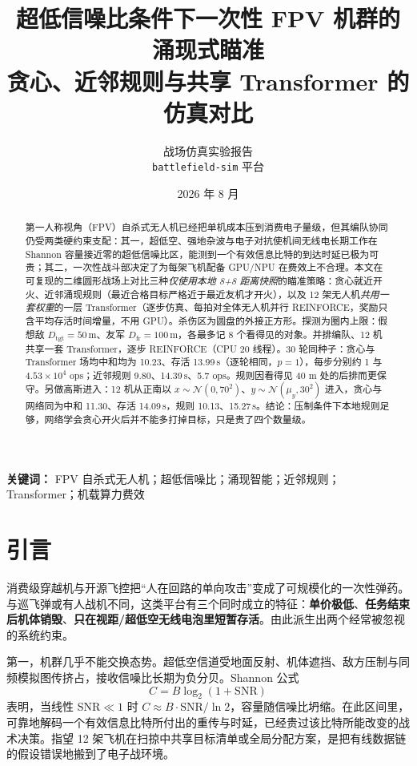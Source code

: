 \documentclass[12pt,a4paper]{article}
\title{\textbf{超低信噪比条件下一次性 FPV 机群的涌现式瞄准}\\[0.35em]
\large 贪心、近邻规则与共享 Transformer 的仿真对比}
\author{战场仿真实验报告\\
\texttt{battlefield-sim} 平台}
\date{2026 年 8 月}
\begin{document}
\maketitle

\begin{abstract}
第一人称视角（FPV）自杀式无人机已经把单机成本压到消费电子量级，但其编队协同仍受两类硬约束支配：其一，超低空、强地杂波与电子对抗使机间无线电长期工作在 Shannon 容量接近零的超低信噪比区，能测到一个有效信息比特的到达时延已极为可贵；其二，一次性战斗部决定了为每架飞机配备 GPU/NPU 在费效上不合理。本文在可复现的二维圆形战场上对比三种\emph{仅使用本地 8+8 距离快照}的瞄准策略：贪心就近开火、近邻涌现规则（最近合格目标严格近于最近友机才开火），以及 12 架无人机\emph{共用一套权重}的一层 Transformer（逐步仿真、每拍对全体无人机并行 REINFORCE，奖励只含平均存活时间增量，不用 GPU）。杀伤区为圆盘的外接正方形。探测为圈内上限：假想敌 $D_{\mathrm{tgt}}=50\,\mathrm{m}$、友军 $D_{\mathrm{fr}}=100\,\mathrm{m}$，各最多记 8 个看得见的对象。并排编队、12 机共享一套 Transformer，逐步 REINFORCE（CPU 20 线程）。30 轮同种子：贪心与 Transformer 场均中和均为 10.23、存活 13.99\,s（逐轮相同，$p=1$），每步分别约 1 与 $4.53\times 10^4$ ops；近邻规则 9.80、14.39\,s、5.7 ops。规则因看得见 40 m 处的后排而更保守。另做高斯进入：12 机从正南以 $x\sim\mathcal N(0,70^2)$、$y\sim\mathcal N(\mu_y,30^2)$ 进入，贪心与网络同为中和 11.30、存活 14.09\,s，规则 10.13、15.27\,s。结论：压制条件下本地规则足够，网络学会贪心开火后并不能多打掉目标，只是贵了四个数量级。
\end{abstract}

\noindent\textbf{关键词：} FPV 自杀式无人机；超低信噪比；涌现智能；近邻规则；Transformer；机载算力费效

\section{引言}

消费级穿越机与开源飞控把“人在回路的单向攻击”变成了可规模化的一次性弹药。与巡飞弹或有人战机不同，这类平台有三个同时成立的特征：\textbf{单价极低}、\textbf{任务结束后机体销毁}、\textbf{只在视距/超低空无线电泡里短暂存活}。由此派生出两个经常被忽视的系统约束。

第一，机群几乎不能交换态势。超低空信道受地面反射、机体遮挡、敌方压制与同频模拟图传挤占，接收信噪比长期为负分贝。Shannon 公式\cite{shannon1948}
\begin{equation}
  C = B \log_2 (1+\mathrm{SNR})
\end{equation}
表明，当线性 $\mathrm{SNR}\ll 1$ 时 $C\approx B\cdot\mathrm{SNR}/\ln 2$，容量随信噪比坍缩\cite{sklar2001}。在此区间里，可靠地解码一个有效信息比特所付出的重传与时延，已经贵过该比特所能改变的战术决策。指望 12 架飞机在扫掠中共享目标清单或全局分配方案，是把有线数据链的假设错误地搬到了电子战环境。
\end{document}
